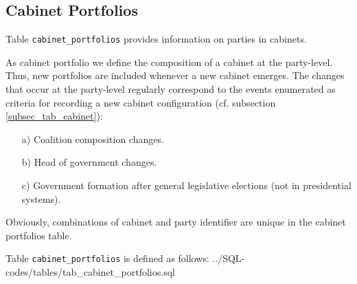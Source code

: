 \subsection{Cabinet Portfolios}\label{subsec_tab_cabinet_portfolios}
Table \texttt{cabinet\_portfolios} provides information on parties in cabinets. 

As cabinet portfolio we define the composition of a cabinet at the party-level.
Thus, new portfolios are included whenever a new cabinet emerges.
The changes that occur at the party-level regularly correspond to the events enumerated as criteria for recording a new cabinet configuration (cf. subsection \ref{subsec_tab_cabinet}):
\begin{itemize}%
\item[a)] Coalition composition changes.
\item[b)] Head of government changes.
\item[c)] Government formation after general legislative elections (not in presidential systems).
\end{itemize}
Obviously, combinations of cabinet and party identifier are unique in the cabinet portfolios table.

Table \texttt{cabinet\_portfolios} is defined as follows:
%
{../SQL-codes/tables/tab_cabinet_portfolios.sql}
